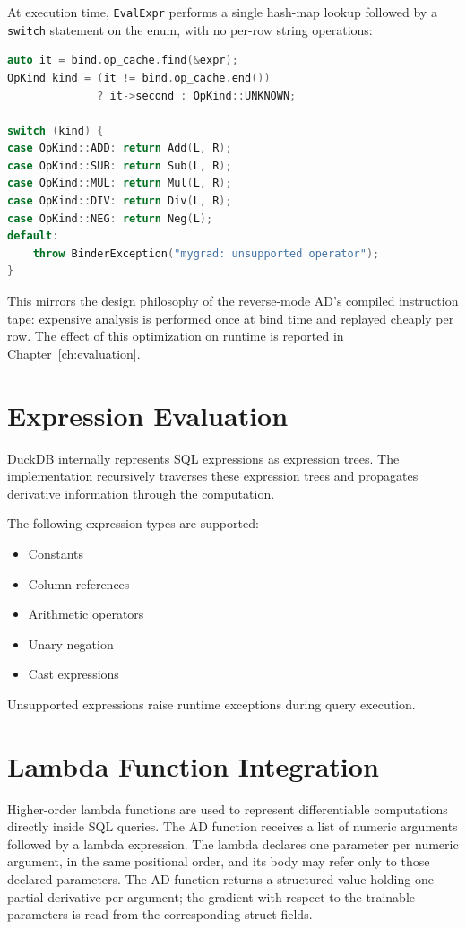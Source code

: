\documentclass[12pt]{report}
\begin{document}
At execution time, \texttt{EvalExpr} performs a single hash-map lookup
followed by a \texttt{switch} statement on the enum, with no per-row
string operations:

\begin{lstlisting}[language=C++]
auto it = bind.op_cache.find(&expr);
OpKind kind = (it != bind.op_cache.end())
              ? it->second : OpKind::UNKNOWN;

switch (kind) {
case OpKind::ADD: return Add(L, R);
case OpKind::SUB: return Sub(L, R);
case OpKind::MUL: return Mul(L, R);
case OpKind::DIV: return Div(L, R);
case OpKind::NEG: return Neg(L);
default:
    throw BinderException("mygrad: unsupported operator");
}
\end{lstlisting}

This mirrors the design philosophy of the reverse-mode AD's compiled
instruction tape: expensive analysis is performed once at bind time
and replayed cheaply per row. The effect of this optimization on
runtime is reported in Chapter~\ref{ch:evaluation}.

\section{Expression Evaluation}

DuckDB internally represents SQL expressions as expression trees. The implementation recursively traverses these expression trees and propagates derivative information through the computation.

The following expression types are supported:

\begin{itemize}
    \item Constants
    \item Column references
    \item Arithmetic operators
    \item Unary negation
    \item Cast expressions
\end{itemize}

Unsupported expressions raise runtime exceptions during query execution.

\section{Lambda Function Integration}

Higher-order lambda functions are used to represent differentiable computations directly inside SQL queries. The AD function receives a list of numeric arguments followed by a lambda expression. The lambda declares one parameter per numeric argument, in the same positional order, and its body may refer only to those declared parameters. The AD function returns a structured value holding one partial derivative per argument; the gradient with respect to the trainable parameters is read from the corresponding struct fields.
\end{document}
